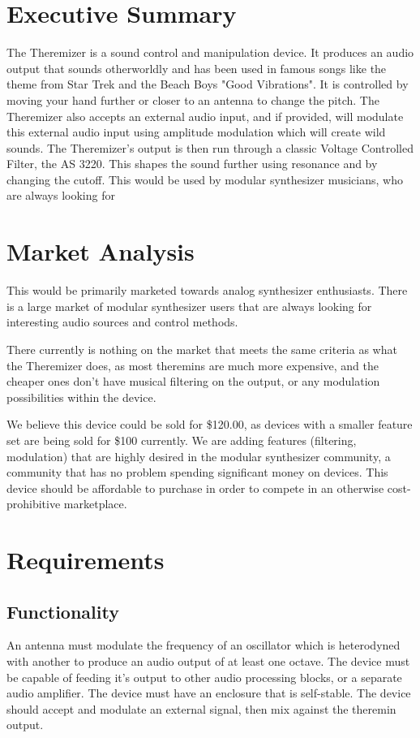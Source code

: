 \documentclass[11pt]{report}
\begin{document}
	\section{Executive Summary}
	The Theremizer is a sound control and manipulation device. It produces an audio output that sounds otherworldly and has been used in famous songs like the theme from Star Trek and the Beach Boys "Good Vibrations". It is controlled by moving your hand further or closer to an antenna to change the pitch. The Theremizer also accepts an external audio input, and if provided, will modulate this external audio input using amplitude modulation which will create wild sounds. The Theremizer's output is then run through a classic Voltage Controlled Filter, the AS 3220. This shapes the sound further using resonance and by changing the cutoff. This would be used by modular synthesizer musicians, who are always looking for 
	\section{Market Analysis}
	This would be primarily marketed towards analog synthesizer enthusiasts. There is a large market of modular synthesizer users that are always looking for interesting audio sources and control methods. \par There currently is nothing on the market that meets the same criteria as what the Theremizer does, as most theremins are much more expensive, and the cheaper ones don't have musical filtering on the output, or any modulation possibilities within the device.
	\par We believe this device could be sold for \$120.00, as devices with a smaller feature set are being sold for \$100 currently. We are adding features (filtering, modulation) that are highly desired in the modular synthesizer community, a community that has no problem spending significant money on devices. This device should be affordable to purchase in order to compete in an otherwise cost-prohibitive marketplace.
	\section{Requirements}
	\subsection{Functionality}
	An antenna must modulate the frequency of an oscillator which is heterodyned with another to produce an audio output of at least one octave. The device must be capable of feeding it's output to other audio processing blocks, or a separate audio amplifier. The device must have an enclosure that is self-stable. The device should accept and modulate an external signal, then mix against the theremin output.
\end{document}
